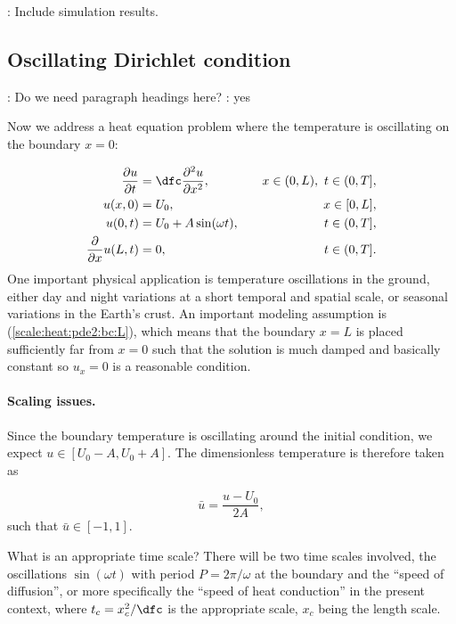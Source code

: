 \documentclass[graybox,envcountchap,sectrefs,final]{svmonodo}
\newcommand{\shortinlinecomment}[3]{{\color{red}{\bf #1}: #2}}
\begin{document}
\shortinlinecomment{hpl 5}{ Include simulation results. }{ Include simulation results. }

\subsection{Oscillating Dirichlet condition}

\shortinlinecomment{hpl 6}{ Do we need paragraph headings here? }{ Do we need paragraph }
\shortinlinecomment{Geir 7}{ yes }{ yes }

Now we address a heat equation problem where the temperature is
oscillating on the boundary $x=0$:

\begin{align}
\frac{\partial u}{\partial t} &=
\dfc \frac{\partial^2 u}{\partial x^2},
\quad &  x\in (0,L),\ t\in (0, T],
\label{scale:heat:pde2}\\ 
u(x,0) &= U_0,
\quad & x\in [0,L],
\label{scale:heat:pde2:ic:u}\\ 
u(0, t) & = U_0 + A\sin(\omega t),
\quad  & t\in (0, T],
\label{scale:heat:pde2:bc:0}\\ 
\frac{\partial}{\partial x} u(L, t) & = 0,
\quad & t\in (0, T].
\label{scale:heat:pde2:bc:L}
\end{align}
One important physical application is temperature oscillations in the
ground, either day and night variations
at a short temporal and spatial scale, or seasonal variations in the
Earth's crust.
An important modeling assumption is (\ref{scale:heat:pde2:bc:L}),
which means that the boundary $x=L$ is placed sufficiently far from $x=0$
such that the solution is much damped and basically constant so
$u_x=0$ is a reasonable condition.

\paragraph{Scaling issues.}
Since the boundary temperature is oscillating around the initial
condition, we expect $u\in [U_0-A,U_0+A]$.
The dimensionless temperature is therefore taken as

\[ \bar u = \frac{u-U_0}{2A},\]
such that $\bar u\in [-1,1]$.

What is an appropriate time scale? There will be two time scales involved,
the oscillations $\sin(\omega t)$ with period $P=2\pi/\omega$ at
the boundary and the ``speed of diffusion'', or more specifically
the ``speed of heat conduction'' in the present context,
where $t_c=x_c^2/\dfc$ is the appropriate scale, $x_c$ being
the length scale.
\end{document}
